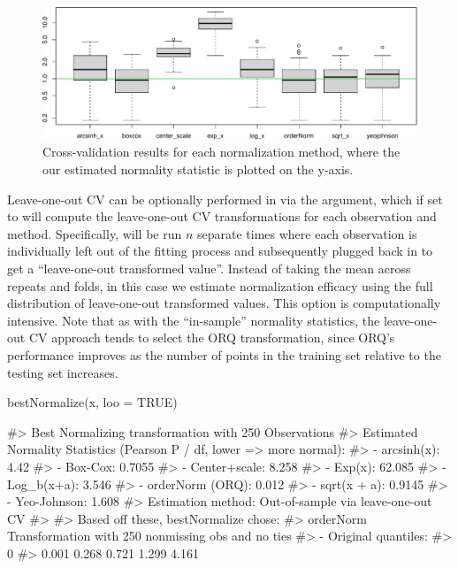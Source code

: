 \begin{Schunk}
\begin{figure}

{\centering \includegraphics[width=1\linewidth]{figs/boxplot-1} 

}

\caption[Cross-validation results for each normalization method, where the our estimated normality statistic is plotted on the y-axis]{Cross-validation results for each normalization method, where the our estimated normality statistic is plotted on the y-axis.}\label{fig:boxplot}
\end{figure}
\end{Schunk}

Leave-one-out CV can be optionally performed in  via
the  argument, which if set to  will compute the
leave-one-out CV transformations for each observation and method.
Specifically,  will be run \(n\) separate times
where each observation is individually left out of the fitting process
and subsequently plugged back in to get a ``leave-one-out transformed
value''. Instead of taking the mean across repeats and folds, in this
case we estimate normalization efficacy using the full distribution of
leave-one-out transformed values. This option is computationally
intensive. Note that as with the ``in-sample'' normality statistics, the
leave-one-out CV approach tends to select the ORQ transformation, since
ORQ's performance improves as the number of points in the training set
relative to the testing set increases.

\begin{Schunk}
\begin{Sinput}
bestNormalize(x, loo = TRUE)
\end{Sinput}
\begin{Soutput}
#> Best Normalizing transformation with 250 Observations
#>  Estimated Normality Statistics (Pearson P / df, lower => more normal):
#>  - arcsinh(x): 4.42
#>  - Box-Cox: 0.7055
#>  - Center+scale: 8.258
#>  - Exp(x): 62.085
#>  - Log_b(x+a): 3.546
#>  - orderNorm (ORQ): 0.012
#>  - sqrt(x + a): 0.9145
#>  - Yeo-Johnson: 1.608
#> Estimation method: Out-of-sample via leave-one-out CV
#>  
#> Based off these, bestNormalize chose:
#> orderNorm Transformation with 250 nonmissing obs and no ties 
#>  - Original quantiles:
#>    0%
#> 0.001 0.268 0.721 1.299 4.161
\end{Soutput}
\end{Schunk}

